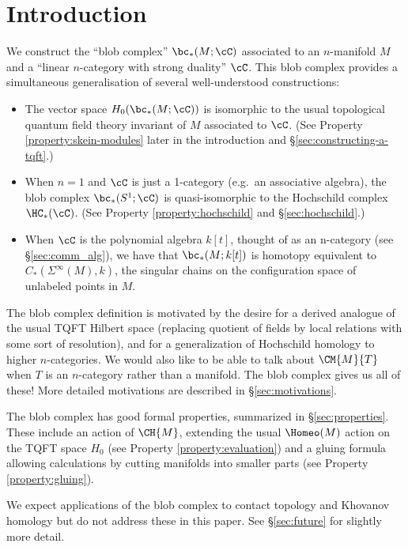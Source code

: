 
\section{Introduction}

We construct the ``blob complex'' $\bc_*(M; \cC)$ associated to an $n$-manifold $M$ and a ``linear $n$-category with strong duality'' $\cC$. This blob complex provides a simultaneous generalisation of several well-understood constructions:
\begin{itemize}
\item The vector space $H_0(\bc_*(M; \cC))$ is isomorphic to the usual topological quantum field theory invariant of $M$ associated to $\cC$. (See Property \ref{property:skein-modules} later in the introduction and \S \ref{sec:constructing-a-tqft}.)
\item When $n=1$ and $\cC$ is just a 1-category (e.g.\ an associative algebra), the blob complex $\bc_*(S^1; \cC)$ is quasi-isomorphic to the Hochschild complex $\HC_*(\cC)$. (See Property \ref{property:hochschild} and \S \ref{sec:hochschild}.)
\item When $\cC$ is the polynomial algebra $k[t]$, thought of as an n-category (see \S \ref{sec:comm_alg}), we have 
that $\bc_*(M; k[t])$ is homotopy equivalent to $C_*(\Sigma^\infty(M), k)$, the singular chains
on the configuration space of unlabeled points in $M$.
\end{itemize}
The blob complex definition is motivated by the desire for a derived analogue of the usual TQFT Hilbert space (replacing quotient of fields by local relations with some sort of resolution), 
and for a generalization of Hochschild homology to higher $n$-categories. We would also like to be able to talk about $\CM{M}{T}$ when $T$ is an $n$-category rather than a manifold. The blob complex gives us all of these! More detailed motivations are described in \S \ref{sec:motivations}.

The blob complex has good formal properties, summarized in \S \ref{sec:properties}. These include an action of $\CH{M}$, 
extending the usual $\Homeo(M)$ action on the TQFT space $H_0$ (see Property \ref{property:evaluation}) and a gluing formula allowing calculations by cutting manifolds into smaller parts (see Property \ref{property:gluing}).

We expect applications of the blob complex to contact topology and Khovanov homology but do not address these in this paper. See \S \ref{sec:future} for slightly more detail.

